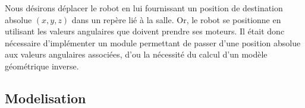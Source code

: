 Nous désirons déplacer le robot en lui fournissant un position de destination absolue $(x, y, z)$ dans un repère lié à la salle. Or, le robot se positionne en utilisant les valeurs angulaires que doivent prendre ses moteurs. Il était donc nécessaire d'implémenter un module permettant de passer d'une position absolue aux valeurs angulaires associées, d'ou la nécessité du calcul d'un modèle géométrique inverse.

\subsection{Modelisation}


